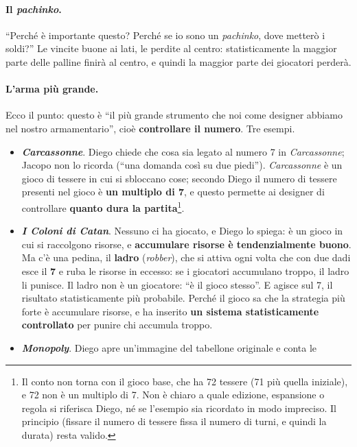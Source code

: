 \paragraph{Il \emph{pachinko}.} ``Perché è importante questo? Perché se io sono un
\emph{pachinko}, dove metterò i soldi?'' Le vincite buone ai lati, le perdite al centro:
statisticamente la maggior parte delle palline finirà al centro, e quindi la maggior parte
dei giocatori perderà.

\paragraph{L'arma più grande.} Ecco il punto: questo è ``il più grande strumento che noi come
designer abbiamo nel nostro armamentario'', cioè \textbf{controllare il numero}. Tre esempi.
\begin{itemize}
  \item \textbf{\emph{Carcassonne}}. Diego chiede che cosa sia legato al numero 7 in
        \emph{Carcassonne}; Jacopo non lo ricorda (``una domanda così su due piedi'').
        \emph{Carcassonne} è un gioco di tessere in cui si sbloccano cose; secondo Diego il
        numero di tessere presenti nel gioco è \textbf{un multiplo di 7}, e questo permette ai
        designer di controllare \textbf{quanto dura la partita}\footnote{Il conto non torna con
        il gioco base, che ha 72 tessere (71 più quella iniziale), e 72 non è un multiplo di
        7. Non è chiaro a quale edizione, espansione o regola si riferisca Diego, né se
        l'esempio sia ricordato in modo impreciso. Il principio (fissare il numero di tessere
        fissa il numero di turni, e quindi la durata) resta valido.}.
  \item \textbf{\emph{I Coloni di Catan}}. Nessuno ci ha giocato, e Diego lo spiega: è un
        gioco in cui si raccolgono risorse, e \textbf{accumulare risorse è tendenzialmente
        buono}. Ma c'è una pedina, il \textbf{ladro} (\emph{robber}), che si attiva ogni volta
        che con due dadi esce il \textbf{7} e ruba le risorse in eccesso: se i giocatori
        accumulano troppo, il ladro li punisce. Il ladro non è un giocatore: ``è il gioco
        stesso''. E agisce sul 7, il risultato statisticamente più probabile. Perché il gioco
        sa che la strategia più forte è accumulare risorse, e ha inserito \textbf{un sistema
        statisticamente controllato} per punire chi accumula troppo.
  \item \textbf{\emph{Monopoly}}. Diego apre un'immagine del tabellone originale e conta le

\end{itemize}
